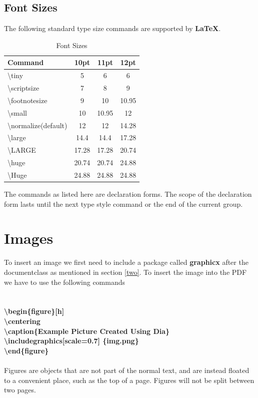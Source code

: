 \documentclass[12pt]{article}
\begin{document}
{\subsection{Font Sizes}
The following standard type size commands are supported by \textbf{ LaTeX}.

\begin{table}[H]
\caption{Font Sizes}
\centering
\begin{tabular} {l|c|c|c}

\hline
{Command} & {10pt} & {11pt}  & {12pt}\\ \hline \hline
\tiny \textbackslash tiny  & 5 & 6 & 6 \\
\scriptsize \textbackslash scriptsize & 7 & 8 & 9 \\
\footnotesize \textbackslash footnotesize & 9 & 10 & 10.95 \\
\small \textbackslash small & 10 & 10.95 & 12 \\
\textbackslash normalize(default)& 12 & 12 & 14.28\\
\large \textbackslash large & 14.4 & 14.4 & 17.28\\
\LARGE \textbackslash LARGE & 17.28 & 17.28 & 20.74\\
\huge \textbackslash huge & 20.74 & 20.74 & 24.88\\
\Huge \textbackslash Huge & 24.88 & 24.88 & 24.88\\
\hline
\end{tabular}
\end{table}

The commands as listed here are declaration forms. The scope of the
declaration form lasts until the next type style command or the end of the
current group.\\



\section{Images}
To insert an image we first need to include a package called \textbf{graphicx} after
the documentclass as mentioned in section \ref{two}. To insert the image into the
PDF we have to use the following commands\\\\\\
\textbf{\textbackslash begin\{figure\}[h]\\
\textbackslash centering\\
\textbackslash caption\{Example Picture Created Using Dia\}\\
\textbackslash includegraphics[scale=0.7] \{img.png\}\\
\textbackslash end\{figure\} }\\\\
Figures are objects that are not part of the normal text, and are instead
floated to a convenient place, such as the top of a page. Figures will not be
split between two pages.\\

}
\end{document}
